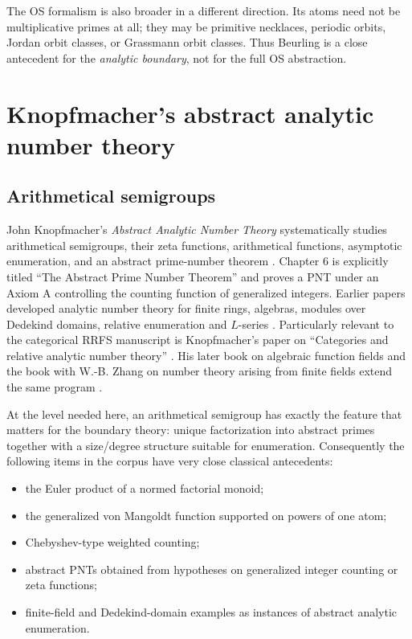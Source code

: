 \documentclass[11pt]{article}
\begin{document}
The OS formalism is also broader in a different direction. Its atoms need not be multiplicative primes at all; they may be primitive necklaces, periodic orbits, Jordan orbit classes, or Grassmann orbit classes. Thus Beurling is a close antecedent for the \emph{analytic boundary}, not for the full OS abstraction.

\section{Knopfmacher's abstract analytic number theory}
\subsection{Arithmetical semigroups}
John Knopfmacher's \emph{Abstract Analytic Number Theory} systematically studies arithmetical semigroups, their zeta functions, arithmetical functions, asymptotic enumeration, and an abstract prime-number theorem \cite{Knopfmacher1975}. Chapter 6 is explicitly titled ``The Abstract Prime Number Theorem'' and proves a PNT under an Axiom A controlling the counting function of generalized integers. Earlier papers developed analytic number theory for finite rings, algebras, modules over Dedekind domains, relative enumeration and $L$-series \cite{Knopfmacher1972a,Knopfmacher1972b,Knopfmacher1973,Knopfmacher1974a}. Particularly relevant to the categorical RRFS manuscript is Knopfmacher's paper on ``Categories and relative analytic number theory'' \cite{Knopfmacher1974b}. His later book on algebraic function fields and the book with W.-B. Zhang on number theory arising from finite fields extend the same program \cite{Knopfmacher1979,KnopfmacherZhang2001}.

At the level needed here, an arithmetical semigroup has exactly the feature that matters for the boundary theory: unique factorization into abstract primes together with a size/degree structure suitable for enumeration. Consequently the following items in the corpus have very close classical antecedents:
\begin{itemize}
\item the Euler product of a normed factorial monoid;
\item the generalized von Mangoldt function supported on powers of one atom;
\item Chebyshev-type weighted counting;
\item abstract PNTs obtained from hypotheses on generalized integer counting or zeta functions;
\item finite-field and Dedekind-domain examples as instances of abstract analytic enumeration.
\end{itemize}
\end{document}
